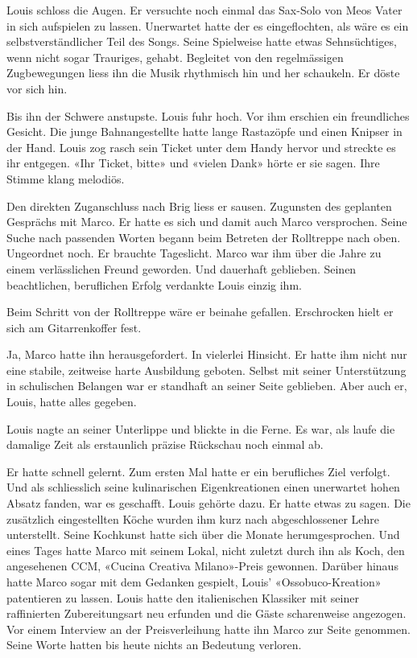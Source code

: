 \sectionbreak

Louis schloss die Augen. Er versuchte noch einmal das Sax-Solo von Meos Vater in
sich aufspielen zu lassen. Unerwartet hatte der es eingeflochten, als
wäre es ein selbstverständlicher Teil des Songs. Seine Spielweise hatte
etwas Sehnsüchtiges, wenn nicht sogar Trauriges, gehabt.
Begleitet von den regelmässigen Zugbewegungen liess ihn die Musik rhythmisch hin und her schaukeln. Er döste vor sich hin.


Bis ihn der Schwere anstupste. Louis fuhr hoch. Vor ihm erschien ein freundliches Gesicht. Die junge Bahnangestellte hatte lange Rastazöpfe und einen Knipser in der Hand. Louis zog rasch
sein Ticket unter dem Handy hervor und streckte es ihr entgegen. «Ihr
Ticket, bitte» und «vielen Dank» hörte er sie sagen. Ihre Stimme klang
melodiös.

Den direkten Zuganschluss nach Brig liess er sausen. Zugunsten des
geplanten Gesprächs mit Marco. Er hatte es sich und damit auch Marco
versprochen. Seine Suche nach passenden Worten begann beim Betreten der Rolltreppe
nach oben. Ungeordnet noch. Er brauchte Tageslicht.
Marco war ihm über die Jahre zu einem verlässlichen Freund geworden.
Und dauerhaft geblieben. Seinen beachtlichen, beruflichen Erfolg verdankte Louis
einzig ihm.

Beim Schritt von der Rolltreppe wäre er beinahe gefallen.
Erschrocken hielt er sich am Gitarrenkoffer fest.

Ja, Marco hatte ihn herausgefordert. In vielerlei Hinsicht. Er hatte ihm
nicht nur eine stabile, zeitweise harte Ausbildung geboten. Selbst mit seiner Unterstützung in schulischen Belangen war er standhaft an seiner Seite geblieben. Aber auch er, Louis, hatte alles gegeben.

Louis nagte an seiner Unterlippe und blickte in die Ferne. Es war, als laufe die damalige Zeit als erstaunlich präzise Rückschau noch einmal ab.

Er hatte schnell gelernt. Zum ersten Mal hatte er ein berufliches Ziel
verfolgt. Und als schliesslich seine kulinarischen Eigenkreationen einen
unerwartet hohen Absatz fanden, war es geschafft. Louis gehörte dazu. 
Er hatte etwas zu sagen. Die zusätzlich eingestellten Köche wurden ihm kurz nach abgeschlossener Lehre unterstellt. 
Seine Kochkunst hatte sich über die Monate herumgesprochen. Und eines Tages
hatte Marco mit seinem Lokal, nicht zuletzt durch ihn als Koch, den
angesehenen CCM, «Cucina Creativa Milano»-Preis gewonnen. Darüber hinaus hatte Marco  
sogar mit dem Gedanken gespielt, Louis’ «Ossobuco-Kreation»
patentieren zu lassen. Louis hatte den italienischen Klassiker mit
seiner raffinierten Zubereitungsart neu erfunden und die Gäste
scharenweise angezogen. Vor einem Interview an der Preisverleihung hatte ihn Marco zur Seite genommen. 
Seine Worte hatten bis heute nichts an Bedeutung verloren.

